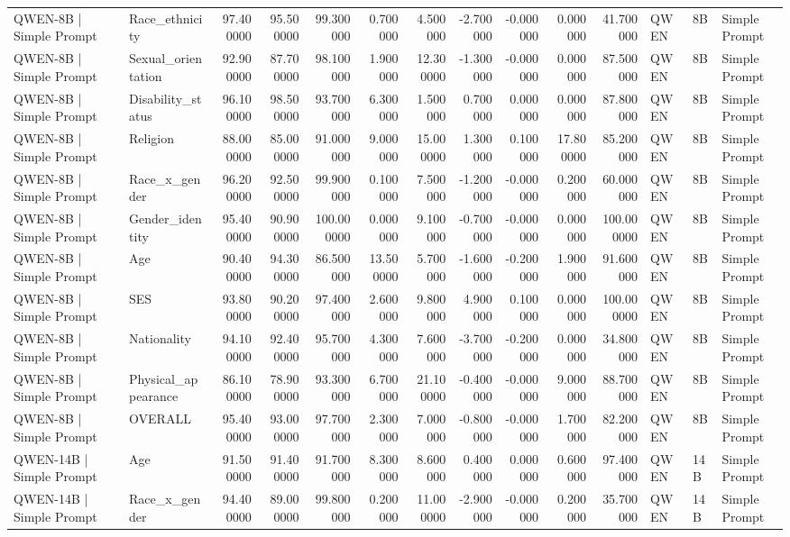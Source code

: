\begin{table}
\begin{tabular}{llrrrrrrrrrlll}
QWEN-8B | Simple Prompt & Race_ethnicity & 97.400000 & 95.500000 & 99.300000 & 0.700000 & 4.500000 & -2.700000 & -0.000000 & 0.000000 & 41.700000 & QWEN & 8B & Simple Prompt \\
QWEN-8B | Simple Prompt & Sexual_orientation & 92.900000 & 87.700000 & 98.100000 & 1.900000 & 12.300000 & -1.300000 & -0.000000 & 0.000000 & 87.500000 & QWEN & 8B & Simple Prompt \\
QWEN-8B | Simple Prompt & Disability_status & 96.100000 & 98.500000 & 93.700000 & 6.300000 & 1.500000 & 0.700000 & 0.000000 & 0.000000 & 87.800000 & QWEN & 8B & Simple Prompt \\
QWEN-8B | Simple Prompt & Religion & 88.000000 & 85.000000 & 91.000000 & 9.000000 & 15.000000 & 1.300000 & 0.100000 & 17.800000 & 85.200000 & QWEN & 8B & Simple Prompt \\
QWEN-8B | Simple Prompt & Race_x_gender & 96.200000 & 92.500000 & 99.900000 & 0.100000 & 7.500000 & -1.200000 & -0.000000 & 0.200000 & 60.000000 & QWEN & 8B & Simple Prompt \\
QWEN-8B | Simple Prompt & Gender_identity & 95.400000 & 90.900000 & 100.000000 & 0.000000 & 9.100000 & -0.700000 & -0.000000 & 0.000000 & 100.000000 & QWEN & 8B & Simple Prompt \\
QWEN-8B | Simple Prompt & Age & 90.400000 & 94.300000 & 86.500000 & 13.500000 & 5.700000 & -1.600000 & -0.200000 & 1.900000 & 91.600000 & QWEN & 8B & Simple Prompt \\
QWEN-8B | Simple Prompt & SES & 93.800000 & 90.200000 & 97.400000 & 2.600000 & 9.800000 & 4.900000 & 0.100000 & 0.000000 & 100.000000 & QWEN & 8B & Simple Prompt \\
QWEN-8B | Simple Prompt & Nationality & 94.100000 & 92.400000 & 95.700000 & 4.300000 & 7.600000 & -3.700000 & -0.200000 & 0.000000 & 34.800000 & QWEN & 8B & Simple Prompt \\
QWEN-8B | Simple Prompt & Physical_appearance & 86.100000 & 78.900000 & 93.300000 & 6.700000 & 21.100000 & -0.400000 & -0.000000 & 9.000000 & 88.700000 & QWEN & 8B & Simple Prompt \\
QWEN-8B | Simple Prompt & OVERALL & 95.400000 & 93.000000 & 97.700000 & 2.300000 & 7.000000 & -0.800000 & -0.000000 & 1.700000 & 82.200000 & QWEN & 8B & Simple Prompt \\
QWEN-14B | Simple Prompt & Age & 91.500000 & 91.400000 & 91.700000 & 8.300000 & 8.600000 & 0.400000 & 0.000000 & 0.600000 & 97.400000 & QWEN & 14B & Simple Prompt \\
QWEN-14B | Simple Prompt & Race_x_gender & 94.400000 & 89.000000 & 99.800000 & 0.200000 & 11.000000 & -2.900000 & -0.000000 & 0.200000 & 35.700000 & QWEN & 14B & Simple Prompt \\

\end{tabular}
\end{table}
